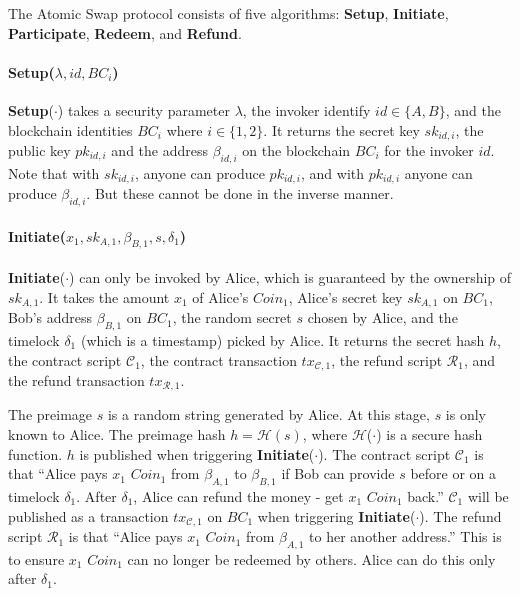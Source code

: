 The Atomic Swap protocol consists of five algorithms:
\textbf{Setup},
\textbf{Initiate},
\textbf{Participate},
\textbf{Redeem}, and
\textbf{Refund}.


\paragraph{\textbf{Setup}($\lambda, id, BC_i$)}
\textbf{Setup}($\cdot$) takes a security parameter $\lambda$,
the invoker identify $id \in \{A, B\}$,
and the blockchain identities $BC_i$ where $i \in \{1, 2\}$.
It returns the secret key $sk_{id, i}$, the public key $pk_{id, i}$ and the address $\beta_{id, i}$ on the blockchain $BC_i$ for the invoker $id$.
Note that with $sk_{id, i}$, anyone can produce $pk_{id, i}$, and with $pk_{id, i}$ anyone can produce $\beta_{id, i}$. But these cannot be done in the inverse manner.

\paragraph{\textbf{Initiate}($x_1, sk_{A, 1}, \beta_{B, 1}, s, \delta_1$)}
\textbf{Initiate}($\cdot$) can only be invoked by Alice, which is guaranteed by the ownership of $sk_{A, 1}$.
It takes the amount $x_1$ of Alice's $Coin_1$,
Alice's secret key $sk_{A, 1}$ on $BC_1$,
Bob's address $\beta_{B, 1}$ on $BC_1$,
the random secret $s$ chosen by Alice,
and the timelock $\delta_1$ (which is a timestamp) picked by Alice.
It returns the secret hash $h$,
the contract script $\mathcal{C}_1$,
the contract transaction $tx_{\mathcal{C}, 1}$,
the refund script $\mathcal{R}_1$,
and the refund transaction $tx_{\mathcal{R}, 1}$.

The preimage $s$ is a random string generated by Alice. At this stage, $s$ is only known to Alice.
The preimage hash $h = \mathcal{H}(s)$, where $\mathcal{H}$($\cdot$) is a secure hash function.
$h$ is published when triggering \textbf{Initiate}($\cdot$).
The contract script $\mathcal{C}_1$ is that ``Alice pays $x_1$ $Coin_1$ from $\beta_{A, 1}$ to $\beta_{B, 1}$ if Bob can provide $s$ before or on a timelock $\delta_1$. After $\delta_1$, Alice can refund the money - get $x_1$ $Coin_1$ back.''
$\mathcal{C}_1$ will be published as a transaction $tx_{\mathcal{C}, 1}$ on $BC_1$ when triggering \textbf{Initiate}($\cdot$).
The refund script $\mathcal{R}_1$ is that ``Alice pays $x_1$ $Coin_1$ from $\beta_{A, 1}$ to her another address.'' This is to ensure $x_1$ $Coin_1$ can no longer be redeemed by others. Alice can do this only after $\delta_1$.


